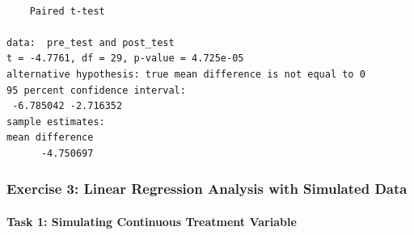 \documentclass[
  singlecolumn]{article}
\let\oldparagraph\paragraph
\renewcommand{\paragraph}[1]{\oldparagraph{#1}\mbox{}}
\theoremstyle{definition}
\theoremstyle{remark}
\begin{document}
\begin{verbatim}

    Paired t-test

data:  pre_test and post_test
t = -4.7761, df = 29, p-value = 4.725e-05
alternative hypothesis: true mean difference is not equal to 0
95 percent confidence interval:
 -6.785042 -2.716352
sample estimates:
mean difference 
      -4.750697 
\end{verbatim}

\subsubsection{\texorpdfstring{\textbf{Exercise 3: Linear Regression
Analysis with Simulated
Data}}{Exercise 3: Linear Regression Analysis with Simulated Data}}\label{exercise-3-linear-regression-analysis-with-simulated-data}

\paragraph{\texorpdfstring{\textbf{Task 1: Simulating Continuous
Treatment
Variable}}{Task 1: Simulating Continuous Treatment Variable}}\label{task-1-simulating-continuous-treatment-variable}
\end{document}
